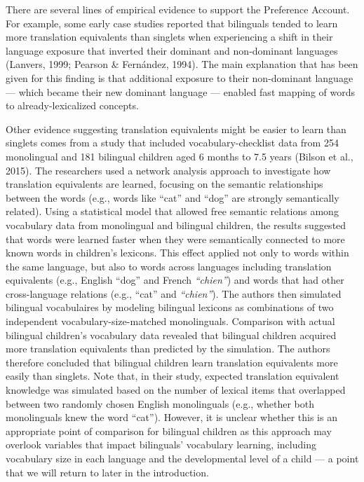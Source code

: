 \documentclass[
  english,
  ,man,floatsintext]{apa6}
\begin{document}
There are several lines of empirical evidence to support the Preference Account. For example, some early case studies reported that bilinguals tended to learn more translation equivalents than singlets when experiencing a shift in their language exposure that inverted their dominant and non-dominant languages (Lanvers, 1999; Pearson \& Fernández, 1994). The main explanation that has been given for this finding is that additional exposure to their non-dominant language --- which became their new dominant language --- enabled fast mapping of words to already-lexicalized concepts.

Other evidence suggesting translation equivalents might be easier to learn than singlets comes from a study that included vocabulary-checklist data from 254 monolingual and 181 bilingual children aged 6 months to 7.5 years (Bilson et al., 2015). The researchers used a network analysis approach to investigate how translation equivalents are learned, focusing on the semantic relationships between the words (e.g., words like ``cat'' and ``dog'' are strongly semantically related). Using a statistical model that allowed free semantic relations among vocabulary data from monolingual and bilingual children, the results suggested that words were learned faster when they were semantically connected to more known words in children's lexicons. This effect applied not only to words within the same language, but also to words across languages including translation equivalents (e.g., English ``dog'' and French \emph{``chien''}) and words that had other cross-language relations (e.g., ``cat'' and \emph{``chien''}). The authors then simulated bilingual vocabulaires by modeling bilingual lexicons as combinations of two independent vocabulary-size-matched monolinguals. Comparison with actual bilingual children's vocabulary data revealed that bilingual children acquired more translation equivalents than predicted by the simulation. The authors therefore concluded that bilingual children learn translation equivalents more easily than singlets. Note that, in their study, expected translation equivalent knowledge was simulated based on the number of lexical items that overlapped between two randomly chosen English monolinguals (e.g., whether both monolinguals knew the word ``cat''). However, it is unclear whether this is an appropriate point of comparison for bilingual children as this approach may overlook variables that impact bilinguals' vocabulary learning, including vocabulary size in each language and the developmental level of a child --- a point that we will return to later in the introduction.
\end{document}
